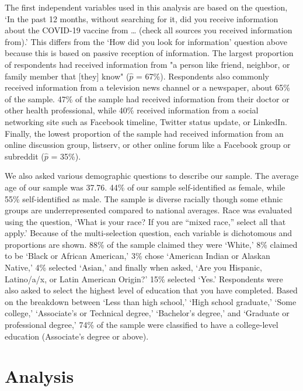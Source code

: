 The first independent variables used in this analysis are based on the question,
`In the past 12 months, without searching for it, did you receive information
about the COVID-19 vaccine from \ldots{} (check all sources you received information
from).' This differs from the `How did you look for information' question above
because this is based on passive reception of information. The largest proportion
of respondents had received information from "a person like friend, neighbor, or
family member that [they] know" (\(\widehat{p}\) = 67\%). Respondents
also commonly received information from a television news channel
or a newspaper, about 65\% of the sample.
47\% of the sample had received information from
their doctor or other health professional, while 40\%
received information from a social networking site such as Facebook timeline,
Twitter status update, or LinkedIn. Finally, the lowest proportion of the sample
had received information from an online discussion group, listserv, or other
online forum like a Facebook group or subreddit
(\(\widehat{p}\) = 35\%).

We also asked various demographic questions to describe our sample. The
average age of our sample was 37.76. 44\% of our sample self-identified as female, 
while 55\% self-identified as male. The sample is diverse racially though some ethnic
groups are underrepresented compared to national averages. Race was evaluated using the
question, `What is your race? If you are ``mixed race,'' select all that apply.'
Because of the multi-selection question, each variable is dichotomous and
proportions are shown. 88\% of the sample claimed
they were `White,' 8\% claimed to be `Black or
African American,' 3\% chose `American Indian or
Alaskan Native,' 4\% selected `Asian,' and finally
when asked, `Are you Hispanic, Latino/a/x, or Latin American Origin?'
15\% selected `Yes.' Respondents were also asked to
select the highest level of education that you have completed. Based on the
breakdown between `Less than high school,' `High school graduate,' `Some college,'
`Associate's or Technical degree,' `Bachelor's degree,' and `Graduate or
professional degree,' 74\% of the sample were classified
to have a college-level education (Associate's degree or above).

\hypertarget{analysis}{%
\section{Analysis}\label{analysis}}

